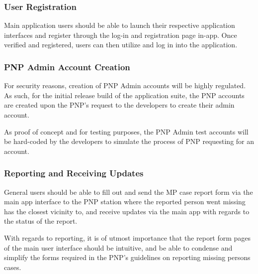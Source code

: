 \subsubsection{User Registration}
Main application users should be able to launch their respective application interfaces and register through the log-in and registration page in-app. Once verified and registered, users can then utilize and log in into the application. 

\subsubsection{PNP Admin Account Creation}

For security reasons, creation of PNP Admin accounts will be highly regulated. As such, for the initial release build of the application suite, the PNP accounts are created upon the PNP's request to the developers to create their admin account.

As proof of concept and for testing purposes, the PNP Admin test accounts will be hard-coded by the developers to simulate the process of PNP requesting for an account. 


\subsubsection{Reporting and Receiving Updates}
General users should be able to fill out and send the MP case report form via the main app interface to the PNP station where the reported person went missing has the closest vicinity to, and receive updates via the main app with regards to the status of the report.

With regards to reporting, it is of utmost importance that the report form pages of the main user interface should be intuitive, and be able to condense and simplify the forms required in the PNP's guidelines on reporting missing persons cases.

